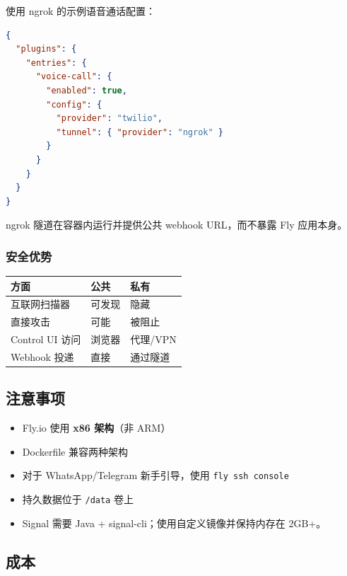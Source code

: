 使用 ngrok 的示例语音通话配置：

\begin{lstlisting}[language=json]
{
  "plugins": {
    "entries": {
      "voice-call": {
        "enabled": true,
        "config": {
          "provider": "twilio",
          "tunnel": { "provider": "ngrok" }
        }
      }
    }
  }
}
\end{lstlisting}


ngrok 隧道在容器内运行并提供公共 webhook URL，而不暴露 Fly 应用本身。

\subsubsection{安全优势}



\begin{table}[h]
\centering
\small
\begin{tabular}{|l|l|l|}
\hline
方面 & 公共 & 私有 \\
\hline
互联网扫描器 & 可发现 & 隐藏 \\
\hline
直接攻击 & 可能 & 被阻止 \\
\hline
Control UI 访问 & 浏览器 & 代理/VPN \\
\hline
Webhook 投递 & 直接 & 通过隧道 \\
\hline
\end{tabular}
\end{table}



\subsection{注意事项}


\begin{itemize}
  \item Fly.io 使用 \textbf{x86 架构}（非 ARM）
  \item Dockerfile 兼容两种架构
  \item 对于 WhatsApp/Telegram 新手引导，使用 \texttt{fly ssh console}
  \item 持久数据位于 \texttt{/data} 卷上
  \item Signal 需要 Java + signal-cli；使用自定义镜像并保持内存在 2GB+。
\end{itemize}


\subsection{成本}


